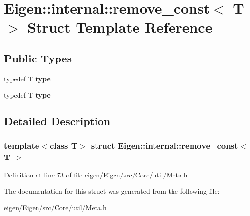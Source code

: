 \hypertarget{struct_eigen_1_1internal_1_1remove__const}{}\section{Eigen\+:\+:internal\+:\+:remove\+\_\+const$<$ T $>$ Struct Template Reference}
\label{struct_eigen_1_1internal_1_1remove__const}
\subsection*{Public Types}
\begin{DoxyCompactItemize}
\item 
\mbox{\label{struct_eigen_1_1internal_1_1remove__const_afe3dbb0bdee2ec8eed4416723d75bc90}} 
typedef \hyperlink{group___sparse_core___module}{T} {\bfseries type}
\item 
\mbox{\label{struct_eigen_1_1internal_1_1remove__const_afe3dbb0bdee2ec8eed4416723d75bc90}} 
typedef \hyperlink{group___sparse_core___module}{T} {\bfseries type}
\end{DoxyCompactItemize}


\subsection{Detailed Description}
\subsubsection*{template$<$class T$>$\newline
struct Eigen\+::internal\+::remove\+\_\+const$<$ T $>$}



Definition at line \hyperlink{eigen_2_eigen_2src_2_core_2util_2_meta_8h_source_l00073}{73} of file \hyperlink{eigen_2_eigen_2src_2_core_2util_2_meta_8h_source}{eigen/\+Eigen/src/\+Core/util/\+Meta.\+h}.



The documentation for this struct was generated from the following file\+:\begin{DoxyCompactItemize}
\item 
eigen/\+Eigen/src/\+Core/util/\+Meta.\+h\end{DoxyCompactItemize}
